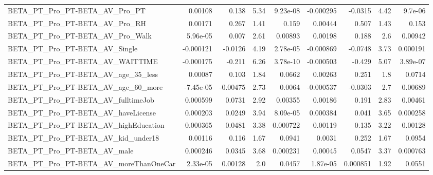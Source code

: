 \begin{tabular}{lrrrrrrrr}
BETA\_PT\_Pro\_PT-BETA\_AV\_Pro\_PT                      &     0.00108 &        0.138 &     5.34 & 9.23e-08 &  -0.000295 &     -0.0315 &         4.42 &       9.7e-06 \\
BETA\_PT\_Pro\_PT-BETA\_AV\_Pro\_RH                      &     0.00171 &        0.267 &     1.41 &    0.159 &    0.00444 &       0.507 &         1.43 &         0.153 \\
BETA\_PT\_Pro\_PT-BETA\_AV\_Pro\_Walk                    &    5.96e-05 &        0.007 &     2.61 &  0.00893 &    0.00198 &       0.188 &          2.6 &       0.00942 \\
BETA\_PT\_Pro\_PT-BETA\_AV\_Single                      &   -0.000121 &      -0.0126 &     4.19 & 2.78e-05 &  -0.000869 &     -0.0748 &         3.73 &      0.000191 \\
BETA\_PT\_Pro\_PT-BETA\_AV\_WAITTIME                    &   -0.000175 &       -0.211 &     6.26 & 3.78e-10 &  -0.000503 &      -0.429 &         5.07 &      3.89e-07 \\
BETA\_PT\_Pro\_PT-BETA\_AV\_age\_35\_less                 &     0.00087 &        0.103 &     1.84 &   0.0662 &    0.00263 &       0.251 &          1.8 &        0.0714 \\
BETA\_PT\_Pro\_PT-BETA\_AV\_age\_60\_more                 &   -7.45e-05 &     -0.00475 &     2.73 &   0.0064 &  -0.000537 &     -0.0303 &          2.7 &       0.00689 \\
BETA\_PT\_Pro\_PT-BETA\_AV\_fulltimeJob                 &    0.000599 &       0.0731 &     2.92 &  0.00355 &    0.00186 &       0.191 &         2.83 &       0.00461 \\
BETA\_PT\_Pro\_PT-BETA\_AV\_haveLicense                 &    0.000203 &       0.0249 &     3.94 & 8.09e-05 &   0.000384 &       0.041 &         3.65 &      0.000258 \\
BETA\_PT\_Pro\_PT-BETA\_AV\_highEducation               &    0.000365 &       0.0481 &     3.38 & 0.000722 &    0.00119 &       0.135 &         3.22 &       0.00128 \\
BETA\_PT\_Pro\_PT-BETA\_AV\_kid\_under18                 &     0.00116 &        0.116 &     1.67 &   0.0941 &     0.0031 &       0.252 &         1.67 &        0.0954 \\
BETA\_PT\_Pro\_PT-BETA\_AV\_male                        &    0.000246 &       0.0345 &     3.68 & 0.000231 &    0.00045 &      0.0547 &         3.37 &      0.000763 \\
BETA\_PT\_Pro\_PT-BETA\_AV\_moreThanOneCar              &    2.33e-05 &      0.00128 &      2.0 &   0.0457 &   1.87e-05 &    0.000851 &         1.92 &        0.0551 \\

\end{tabular}
